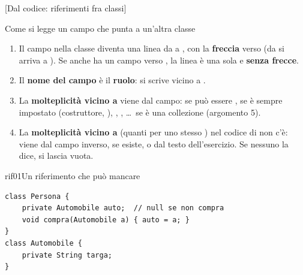 [Dal codice: riferimenti fra classi]

\begin{guida}{Come si legge un campo che punta a un'altra classe}
\begin{enumerate}[nosep, leftmargin=*]
  \item Il campo  nella classe  diventa una linea da  a , con la \textbf{freccia}
        verso  (da  si arriva a ). Se anche  ha un campo verso , la linea è una
        sola e \textbf{senza frecce}.
  \item Il \textbf{nome del campo} è il \textbf{ruolo}: si scrive vicino a .
  \item La \textbf{molteplicità vicino a } viene dal campo:  se può essere ,
         se è sempre impostato (costruttore, ), \code{*}, , \ldots\ se è una
        collezione (argomento 5).
  \item La \textbf{molteplicità vicino a } (quanti  per uno stesso ) nel codice di  non
        c'è: viene dal campo inverso, se esiste, o dal testo dell'esercizio. Se nessuno la dice, si lascia vuota.
\end{enumerate}
\end{guida}

\begin{caso}{rif01}{Un riferimento che può mancare}
\begin{lstlisting}[style=javacs]
class Persona {
    private Automobile auto;  // null se non compra
    void compra(Automobile a) { auto = a; }
}
class Automobile {
    private String targa;
}
\end{lstlisting}
\tcblower
{}
\end{caso}

